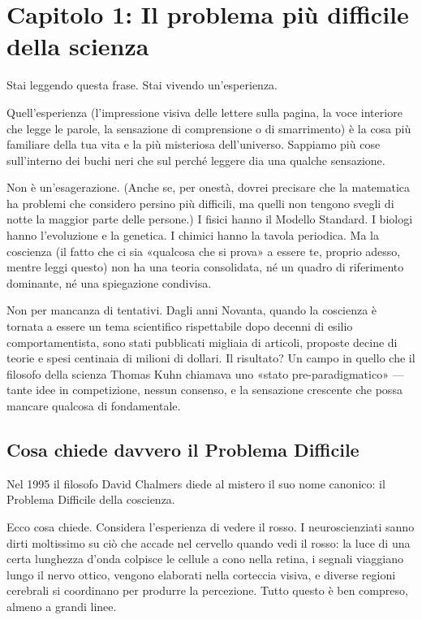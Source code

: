 \documentclass[11pt, twoside, openright]{book}
\begin{document}
\mainmatter
\pagestyle{fancy}
\chapter*{Capitolo 1: Il problema più difficile della scienza}

Stai leggendo questa frase. Stai vivendo un'esperienza.

Quell'esperienza (l'impressione visiva delle lettere sulla pagina, la voce interiore che legge le parole, la sensazione di comprensione o di smarrimento) è la cosa più familiare della tua vita e la più misteriosa dell'universo. Sappiamo più cose sull'interno dei buchi neri che sul perché leggere dia una qualche sensazione.

Non è un'esagerazione. (Anche se, per onestà, dovrei precisare che la matematica ha problemi che considero persino più difficili, ma quelli non tengono svegli di notte la maggior parte delle persone.) I fisici hanno il Modello Standard. I biologi hanno l'evoluzione e la genetica. I chimici hanno la tavola periodica. Ma la coscienza (il fatto che ci sia «qualcosa che si prova» a essere te, proprio adesso, mentre leggi questo) non ha una teoria consolidata, né un quadro di riferimento dominante, né una spiegazione condivisa.

Non per mancanza di tentativi. Dagli anni Novanta, quando la coscienza è tornata a essere un tema scientifico rispettabile dopo decenni di esilio comportamentista, sono stati pubblicati migliaia di articoli, proposte decine di teorie e spesi centinaia di milioni di dollari. Il risultato? Un campo in quello che il filosofo della scienza Thomas Kuhn chiamava uno «stato pre-paradigmatico» --- tante idee in competizione, nessun consenso, e la sensazione crescente che possa mancare qualcosa di fondamentale.

\section*{Cosa chiede davvero il Problema Difficile}

Nel 1995 il filosofo David Chalmers diede al mistero il suo nome canonico: il Problema Difficile della coscienza.

Ecco cosa chiede. Considera l'esperienza di vedere il rosso. I neuroscienziati sanno dirti moltissimo su ciò che accade nel cervello quando vedi il rosso: la luce di una certa lunghezza d'onda colpisce le cellule a cono nella retina, i segnali viaggiano lungo il nervo ottico, vengono elaborati nella corteccia visiva, e diverse regioni cerebrali si coordinano per produrre la percezione. Tutto questo è ben compreso, almeno a grandi linee.
\end{document}
